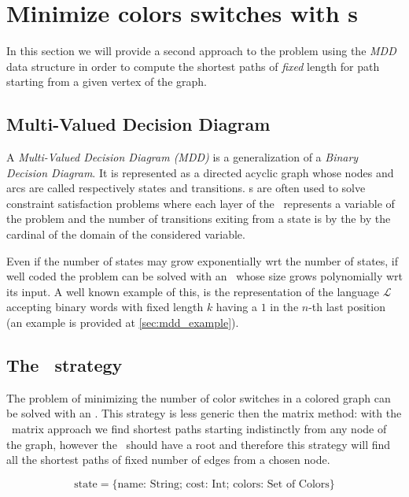 \section{Minimize colors switches with \mdd s}

In this section we will provide a second approach to the problem using the \textit{MDD} data structure in order to compute the shortest paths of \textit{fixed} length for path starting from a given vertex of the graph.


\subsection{Multi-Valued Decision Diagram}

A \textit{Multi-Valued Decision Diagram (MDD)}\cite{regin} is a generalization of a \textit{Binary Decision Diagram}. It is represented as a directed acyclic graph whose nodes and arcs are called respectively states and transitions. \mdd s are often used to solve constraint satisfaction problems where each layer of the \mdd\ represents a variable of the problem and the number of transitions exiting from a state is  by the  by the cardinal of the domain of the considered variable.

Even if the number of states may grow exponentially wrt the number of states, if well coded the problem can be solved with an \mdd\ whose size grows polynomially wrt its input. A well known example of this, is the representation of the language $\mathcal{L}$ accepting binary words with fixed length $k$ having a $1$ in the $n$-th last position (an example is provided at \cref{sec:mdd_example}).

\subsection{The \mdd\ strategy}
\label{sec:algo_mdd}
The problem of minimizing the number of color switches in a colored graph can be solved with an \mdd. This strategy is less generic then the matrix method: with the \FW\ matrix approach we find shortest paths starting indistinctly from any node of the graph, however the \mdd\ should have a root and therefore this strategy will find all the shortest paths of fixed number of edges from a chosen node.

\begin{equation}
  \label{eq:record}
  \text{state} = \{\text{name: String; cost: Int; colors: Set of Colors}\}
\end{equation}

